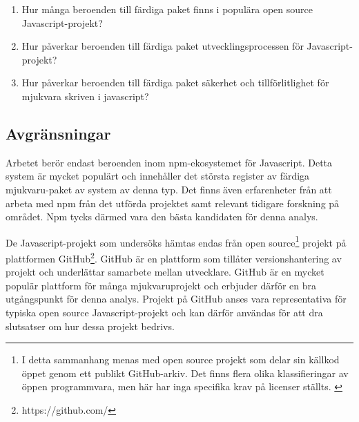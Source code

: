 \begin{enumerate}
\item Hur många beroenden till färdiga paket finns i populära open source Javascript-projekt?

\item Hur påverkar beroenden till färdiga paket utvecklingsprocessen för Javascript-projekt?

\item Hur påverkar beroenden till färdiga paket säkerhet och tillförlitlighet för mjukvara skriven i javascript?

\end{enumerate}

\subsection{Avgränsningar}
\label{subsec:joel_o-delimitations}
Arbetet berör endast beroenden inom npm-ekosystemet för Javascript. Detta system är mycket populärt och innehåller det största register av färdiga mjukvaru-paket av system av denna typ.\cite{Decan2018} Det finns även erfarenheter från att arbeta med npm från det utförda projektet samt relevant tidigare forskning på området. Npm tycks därmed vara den bästa kandidaten för denna analys.

De Javascript-projekt som undersöks hämtas endas från open source\footnote{I detta sammanhang menas med open source projekt som delar sin källkod öppet genom ett publikt GitHub-arkiv. Det finns flera olika klassifieringar av öppen programmvara, men här har inga specifika krav på licenser ställts. \cite{what-is-open-source}} projekt på plattformen GitHub\footnote{https://github.com/}. GitHub är en plattform som tillåter versionshantering av projekt och underlättar samarbete mellan utvecklare. GitHub är en mycket populär plattform för många mjukvaruprojekt och erbjuder därför en bra utgångspunkt för denna analys. Projekt på GitHub anses vara representativa för typiska open source Javascript-projekt och kan därför användas för att dra slutsatser om hur dessa projekt bedrivs.
